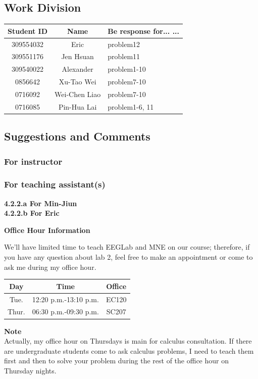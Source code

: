 \documentclass[a4 paper]{article}
\begin{document}
\subsection{Work Division}
\begin{center}
    \begin{tabular}{||c|c|l||}
    \hline
    Student ID & Name & Be response for... ... \\\hline
    309554032 & Eric & problem12\\\hline
    309551176 & Jen Hsuan & problem11\\\hline
    309540022 & Alexander & problem1-10 \\\hline
    0856642 & Xu-Tao Wei &  problem7-10\\\hline
    0716092 & Wei-Chen Liao & problem7-10\\\hline
    0716085 & Pin-Hua Lai & problem1-6, 11\\\hline
\end{tabular}
\end{center}
\subsection{Suggestions and Comments}
\subsubsection{For instructor}
\subsubsection{For teaching assistant(s)}
\textbf{4.2.2.a For Min-Jiun}\\
\textbf{4.2.2.b For Eric}\\
\noindent{\color{LightRubineRed} \rule{\linewidth}{0.5mm}}
\begin{center}
    \large{\textbf{Office Hour Information}}
\end{center}
\par We'll have limited time to teach EEGLab and MNE on our course; therefore, if you have any question about lab 2, feel free to make an appointment or come to ask me during my office hour.\\
\begin{center}
    \begin{tabular}{||c|c|c||}
    \hline
    Day & Time & Office\\
        \hline\hline
          Tue. & 12:20 p.m.-13:10 p.m. & EC120 \\
          \hline
          Thur. & 06:30 p.m.-09:30 p.m. & SC207\\
          \hline
    \end{tabular}
\end{center}
\textbf{Note}\\
Actually, my office hour on Thursdays is main for calculus consultation. If there are undergraduate students come to ask calculus problems, I need to teach them first and then to solve your problem during the rest of the office hour on Thursday nights.\\
\noindent{\color{LightRubineRed} \rule{\linewidth}{0.5mm}}
\end{document}
